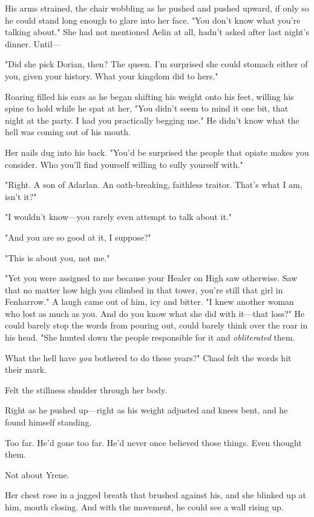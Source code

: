 His arms strained, the chair wobbling as he pushed and pushed upward, if only so he could stand long enough to glare into her face.
"You don't know what you're talking about."
She had not mentioned Aelin at all, hadn't asked after last night's dinner.
Until---

"Did she pick Dorian, then?
The queen.
I'm surprised she could stomach either of you, given your history.
What your kingdom did to hers."

Roaring filled his ears as he began shifting his weight onto his feet, willing his spine to hold while he spat at her, "You didn't seem to mind it one bit, that night at the party.
I had you practically begging me."
He didn't know what the hell was coming out of his mouth.

Her nails dug into his back.
"You'd be surprised the people that opiate makes you consider.
Who you'll find yourself willing to sully yourself with."

"Right.
A son of Adarlan.
An oath-breaking, faithless traitor.
That's what I am, isn't it?"

"I wouldn't know---you rarely even attempt to talk about it."

"And you are so good at it, I suppose?"

"This is about you, not me."

"Yet you were assigned to me because your Healer on High saw otherwise.
Saw that no matter how high you climbed in that tower, you're still that girl in Fenharrow."
A laugh came out of him, icy and bitter.
"I knew another woman who lost as much as you.
And do you know what she did with it---that loss?"
He could barely stop the words from pouring out, could barely think over the roar in his head.
"She hunted down the people responsible for it and \emph{obliterated} them.

What the hell have \emph{you} bothered to do these years?"
Chaol felt the words hit their mark.

Felt the stillness shudder through her body.

Right as he pushed up---right as his weight adjusted and knees bent, and he found himself standing.

Too far.
He'd gone too far.
He'd never once believed those things.
Even thought them.

Not about Yrene.

Her chest rose in a jagged breath that brushed against his, and she blinked up at him, mouth closing.
And with the movement, he could see a wall rising up.

